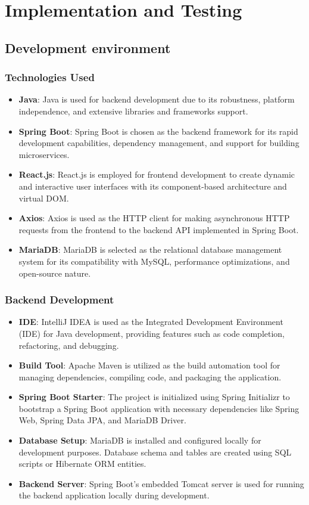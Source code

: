 \documentclass[a4paper, 12pt]{report}
\begin{document}
\chapter{Implementation and Testing}
\section{Development environment}
\subsection{Technologies Used}
\begin{itemize}
  \item \textbf{Java}: Java is used for backend development due to its robustness, platform independence, and extensive libraries and frameworks support.
  \item \textbf{Spring Boot}: Spring Boot is chosen as the backend framework for its rapid development capabilities, dependency management, and support for building microservices.
  \item \textbf{React.js}: React.js is employed for frontend development to create dynamic and interactive user interfaces with its component-based architecture and virtual DOM.
  \item \textbf{Axios}: Axios is used as the HTTP client for making asynchronous HTTP requests from the frontend to the backend API implemented in Spring Boot.
  \item \textbf{MariaDB}: MariaDB is selected as the relational database management system for its compatibility with MySQL, performance optimizations, and open-source nature.
\end{itemize}
\subsection{Backend Development}
\begin{itemize}
  \item \textbf{IDE}: IntelliJ IDEA is used as the Integrated Development Environment (IDE) for Java development, providing features such as code completion, refactoring, and debugging.
  \item \textbf{Build Tool}: Apache Maven is utilized as the build automation tool for managing dependencies, compiling code, and packaging the application.
  \item \textbf{Spring Boot Starter}: The project is initialized using Spring Initializr to bootstrap a Spring Boot application with necessary dependencies like Spring Web, Spring Data JPA, and MariaDB Driver.
  \item \textbf{Database Setup}: MariaDB is installed and configured locally for development purposes. Database schema and tables are created using SQL scripts or Hibernate ORM entities.
  \item \textbf{Backend Server}: Spring Boot's embedded Tomcat server is used for running the backend application locally during development.
\end{itemize}
\end{document}

